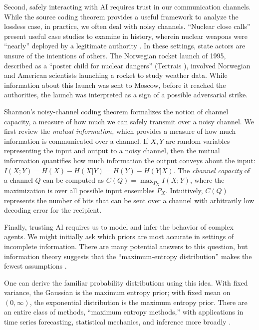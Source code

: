 \documentclass[11pt]{article}
\begin{document}
Second, safely interacting with AI requires trust in our communication channels.  While the source coding theorem provides a useful framework to analyze the lossless case, in practice, we often deal with noisy channels.  ``Nuclear close calls'' present useful case studies to examine in history, wherein nuclear weapons were ``nearly'' deployed by a legitimate authority \cite{tertrais2017brink}.  In these settings, state actors are unsure of the intentions of others.  The Norwegian rocket launch of 1995, described as a ``poster child for nuclear dangers'' (Tertrais \cite{tertrais2017brink}), involved Norwegian and American scientists launching a rocket to study weather data.  While information about this launch was sent to Moscow, before it reached the authorities, the launch was interpreted as a sign of a possible adversarial strike.

Shannon's noisy-channel coding theorem formalizes the notion of channel capacity, a measure of how much we can safely transmit over a noisy channel.  We first review the {\it mutual information,} which provides a measure of how much information is communicated over a channel.  If $X, Y$ are random variables representing the input and output to a noisy channel, then the mutual information quantifies how much information the output conveys about the input: $I(X; Y) = H(X) - H(X | Y) = H(Y) - H(Y|X)$.  The {\it channel capacity} of a channel $Q$ can be computed as $C(Q) = \max_{P_X} I(X; Y)$, where the maximization is over all possible input ensembles $P_X$.  Intuitively, $C(Q)$ represents the number of bits that can be sent over a channel with arbitrarily low decoding error for the recipient.

Finally, trusting AI requires us to model and infer the behavior of complex agents.  We might initially ask which priors are most accurate in settings of incomplete information.  There are many potential answers to this question, but information theory suggests that the ``maximum-entropy distribution'' makes the fewest assumptions \cite{adi-maxent, mackay2003information}.  

One can derive the familiar probability distributions using this idea.  With fixed variance, the Gaussian is the maximum entropy prior; with fixed mean on $(0, \infty)$, the exponential distribution is the maximum entropy prior.  There are an entire class of methods, ``maximum entropy methods,'' with applications in time series forecasting, statistical mechanics, and inference more broadly \cite{jaynes1982rationale, jaynes2003probability}.
\end{document}
